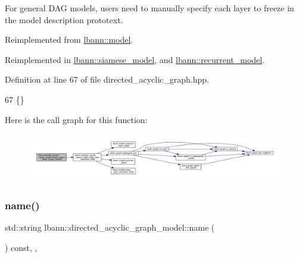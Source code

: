 For general D\+AG models, users need to manually specify each layer to freeze in the model description prototext. 

Reimplemented from \hyperlink{classlbann_1_1model_ad0131e36e763470a7bbf67e83b42cd14}{lbann\+::model}.



Reimplemented in \hyperlink{classlbann_1_1siamese__model_a3960a32fd45059516f3acb41549e1e92}{lbann\+::siamese\+\_\+model}, and \hyperlink{classlbann_1_1recurrent__model_aa4e43de8bf0d11a0f51dedbcf22a73cc}{lbann\+::recurrent\+\_\+model}.



Definition at line 67 of file directed\+\_\+acyclic\+\_\+graph.\+hpp.


\begin{DoxyCode}
67 \{\}
\end{DoxyCode}
Here is the call graph for this function\+:\nopagebreak
\begin{figure}[H]
\begin{center}
\leavevmode
\includegraphics[width=350pt]{classlbann_1_1directed__acyclic__graph__model_a9f2a6e9472235ec91c5a50356471b3cb_cgraph}
\end{center}
\end{figure}
\mbox{\label{classlbann_1_1directed__acyclic__graph__model_ad2b97ab2670e76538a754e28e19b5c94}} 
\subsubsection{\texorpdfstring{name()}{name()}}
{\footnotesize\ttfamily std\+::string lbann\+::directed\+\_\+acyclic\+\_\+graph\+\_\+model\+::name (\begin{DoxyParamCaption}{ }\end{DoxyParamCaption}) const\hspace{0.3cm}{\ttfamily [inline]}, {\ttfamily [override]}, {\ttfamily [virtual]}}

